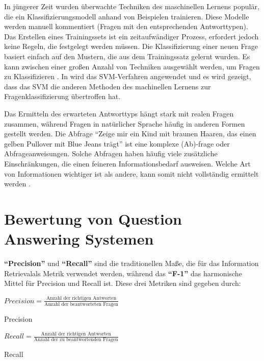 \documentclass[
        ngerman,
        paper=a4,
        numbers=noendperiod,
]{scrreprt}
\begin{document}
In jüngerer Zeit wurden überwachte Techniken des maschinellen Lernens populär, die ein Klassifizierungsmodell anhand von Beispielen trainieren. Diese Modelle werden manuell kommentiert (Fragen mit den entsprechenden Antworttypen). Das Erstellen eines Trainingssets ist ein zeitaufwändiger Prozess, erfordert jedoch keine Regeln, die festgelegt werden müssen. Die Klassifizierung einer neuen Frage basiert einfach auf den Mustern, die aus dem Trainingssatz gelernt wurden. Es kann zwischen einer großen Anzahl von Techniken ausgewählt werden, um Fragen zu Klassifizieren \citep[S. 5421]{Kolomiyets2011APerspective}. In \citep{zhang2003question} wird das SVM-Verfahren angewendet und es wird gezeigt, dass das SVM die anderen Methoden des machinellen Lernens zur Fragenklassifizierung übertroffen hat.

Das Ermitteln des erwarteten Antworttyps hängt stark mit realen Fragen zusammen, während Fragen in natürlicher Sprache häufig in anderen Formen gestellt werden. Die Abfrage \enquote{Zeige mir ein Kind mit braunen Haaren, das einen gelben Pullover mit Blue Jeans trägt} ist eine komplexe (Ab)-frage oder Abfrageanweisungen. Solche Abfragen   haben häufig viele zusätzliche Einschränkungen, die einen feineren Informationsbedarf ausweisen. Welche Art von Informationen wichtiger ist als andere, kann somit nicht vollständig ermittelt werden \citep[S. 5422]{Kolomiyets2011APerspective}. 


\section{Bewertung von Question Answering Systemen}
\textbf{\enquote{Precision}} und \textbf{\enquote{Recall}} sind die traditionellen Maße, die für das Information Retrievalals Metrik verwendet werden, während das \textbf{\enquote{F-1}} das harmonische Mittel für Precision und Recall ist. Diese drei Metriken sind gegeben durch:

\begin{xequation-} 
\centering ${Precision}= \frac{\text{Anzahl der richtigen Antworten}}{\text{Anzahl der beantworteten Fragen}}$
\caption[Precision]{Precision} 
    \label{eqn:PRE}
\end{xequation-} 

\begin{xequation-} 
\centering ${Recall}= \frac{\text{Anzahl der richtigen Antworten}}{\text{Anzahl der zu beantwortenden Fragen}}$
\caption[Recall]{Recall} 
    \label{eqn:REC}
\end{xequation-} 
\end{document}
